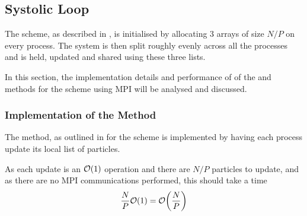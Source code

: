 \subsection{Systolic Loop}

The \systolicloop{} scheme, as described in
,
is initialised by allocating 3 arrays of
size $N/P$ on every process.
%
The system is then split roughly evenly across all the processes
and is held, updated and shared using these three lists.

In this section, the implementation details and performance of
of the \individualoperation{} and \pairoperation{} methods
for the \systolicloop{} scheme using MPI will be analysed and discussed.


%
%

\subsubsection{Implementation of the \individualoperation{} Method}

The \individualoperation{} method, as outlined in
for the \systolicloop{} scheme
is implemented by having each process update its local list of particles.

As each update is an $\mathcal{O}{\left({ 1 }\right)}$ operation and there are $N/P$ particles
to update, and as there are no MPI communications performed,
this should take a time
\begin{equation}
    \frac{N}{P}\mathcal{O}{\left({ 1 }\right)} = \mathcal{O}{\left({ \frac{N}{P} }\right)}
\end  {equation}

\begin{figure}[!h]
    
    \caption{}
    \label{fig:v0_systolic_individual_operation_512_logtime}
\end  {figure}

\begin{figure}[!h]
    
    \caption{}
    \label{fig:v0_systolic_individual_operation_4096_logtime}
\end  {figure}

\begin{figure}[!h]
    
    \caption{}
    \label{fig:v0_systolic_individual_operation_32768_logtime}
\end  {figure}

